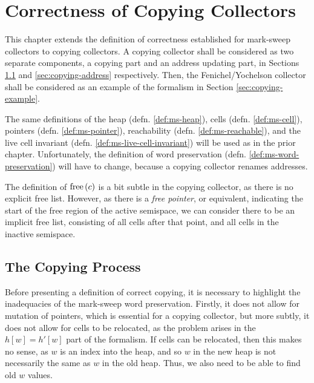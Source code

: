 \chapter{Correctness of Copying Collectors}
\label{sec:copying}

This chapter extends the definition of correctness established for
mark-sweep collectors to copying collectors. A copying collector shall
be considered as two separate components, a copying part and an
address updating part, in Sections \ref{sec:copying-copying} and
\ref{sec:copying-address} respectively. Then, the Fenichel/Yochelson
collector shall be considered as an example of the formalism in
Section \ref{sec:copying-example}.

The same definitions of the heap (defn. \ref{def:ms-heap}), cells
(defn. \ref{def:ms-cell}), pointers (defn. \ref{def:ms-pointer}),
reachability (defn. \ref{def:ms-reachable}), and the live cell
invariant (defn. \ref{def:ms-live-cell-invariant}) will be used as in
the prior chapter. Unfortunately, the definition of word preservation
(defn. \ref{def:ms-word-preservation}) will have to change, because a
copying collector renames addresses.

The definition of $\mathrm{free}\left(c\right)$ is a bit subtle in the copying collector,
as there is no explicit free list. However, as there is a \textit{free
  pointer}, or equivalent, indicating the start of the free region of
the active semispace, we can consider there to be an implicit free
list, consisting of all cells after that point, and all cells in the
inactive semispace.

\section{The Copying Process}
\label{sec:copying-copying}

Before presenting a definition of correct copying, it is necessary to
highlight the inadequacies of the mark-sweep word
preservation. Firstly, it does not allow for mutation of pointers,
which is essential for a copying collector, but more subtly, it does
not allow for cells to be relocated, as the problem arises in the
$h[w] = h'[w]$ part of the formalism. If cells can be relocated, then
this makes no sense, as $w$ is an index into the heap, and so $w$ in
the new heap is not necessarily the same as $w$ in the old heap. Thus,
we also need to be able to find old $w$ values.

\pagebreak

